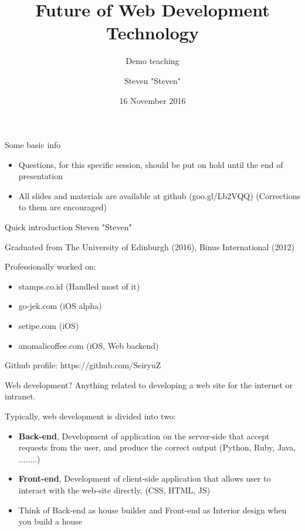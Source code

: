 \documentclass{beamer}
\title{Future of Web Development Technology}
\subtitle{Demo teaching}
\date{16 November 2016}
\author{Steven "Steven"}
\institute{BINUS INTERNATIONAL}
\begin{document}
  \maketitle
  
  \begin{frame}{Some basic info}
  	\begin{itemize}
		\item Questions, for this specific session, should be put on hold until the end of presentation
		\item All slides and materials are available at github (goo.gl/Lb2VQQ) (Corrections to them are encouraged)
	\end{itemize}
  \end{frame}
  
  \begin{frame}{Quick introduction}
	Steven "Steven"
	
	Graduated from The University of Edinburgh (2016), Binus International (2012)
	
	Professionally worked on:
	\begin{itemize}
		\item stamps.co.id  (Handled most of it)
		\item go-jek.com (iOS alpha)
		\item setipe.com  (iOS)
		\item anomalicoffee.com (iOS, Web backend)
	\end{itemize}
	
	Github profile: https://github.com/SeiryuZ
  \end{frame}
  
    \begin{frame}{Web development?}
	Anything related to developing a web site for the internet or intranet.
	
	\pause
	Typically, web development is divided into two:
	
	\pause
	\begin{itemize}[<+->]
		\item \textbf{Back-end}, Development of application on the server-side that accept requests from the user, and produce the correct output (Python, Ruby, Java, ........)  
		
		\item \textbf{Front-end}, Development of client-side application that allows user to interact with the web-site directly. (CSS, HTML, JS)
		
		\item Think of Back-end as house builder and Front-end as Interior design when you build a house
	\end{itemize}
    \end{frame}
\end{document}
